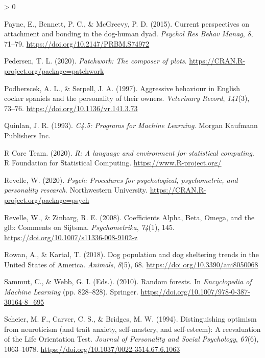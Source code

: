 \documentclass[
  english,
  ,pub,floatsintext]{apa6}
\newlength{\cslhangindent}
\newenvironment{CSLReferences}[2] %
 {%
  \setlength{\parindent}{0pt}
  \ifodd #1 \everypar{\setlength{\hangindent}{\cslhangindent}}\ignorespaces\fi
  \ifnum #2 > 0
  \setlength{\parskip}{#2\baselineskip}
  \fi
 }%
 {}
\begin{document}
\begin{CSLReferences}{1}{0}
\leavevmode\hypertarget{ref-Payne.etal.2015}{}%
Payne, E., Bennett, P. C., \& McGreevy, P. D. (2015). Current perspectives on attachment and bonding in the dog-human dyad. \emph{Psychol Res Behav Manag}, \emph{8}, 71--79. \url{https://doi.org/10.2147/PRBM.S74972}

\leavevmode\hypertarget{ref-R-patchwork}{}%
Pedersen, T. L. (2020). \emph{Patchwork: The composer of plots}. \url{https://CRAN.R-project.org/package=patchwork}

\leavevmode\hypertarget{ref-Podberscek.Serpell.1997}{}%
Podberscek, A. L., \& Serpell, J. A. (1997). Aggressive behaviour in {English} cocker spaniels and the personality of their owners. \emph{Veterinary Record}, \emph{141}(3), 73--76. \url{https://doi.org/10.1136/vr.141.3.73}

\leavevmode\hypertarget{ref-Quinlan.1993}{}%
Quinlan, J. R. (1993). \emph{C4.5: {Programs} for {Machine Learning}}. {Morgan Kaufmann Publishers Inc.}

\leavevmode\hypertarget{ref-R-base}{}%
R Core Team. (2020). \emph{R: A language and environment for statistical computing}. R Foundation for Statistical Computing. \url{https://www.R-project.org/}

\leavevmode\hypertarget{ref-R-psych}{}%
Revelle, W. (2020). \emph{Psych: Procedures for psychological, psychometric, and personality research}. Northwestern University. \url{https://CRAN.R-project.org/package=psych}

\leavevmode\hypertarget{ref-Revelle.Zinbarg.2008}{}%
Revelle, W., \& Zinbarg, R. E. (2008). Coefficients {Alpha}, {Beta}, {Omega}, and the glb: {Comments} on {Sijtsma}. \emph{Psychometrika}, \emph{74}(1), 145. \url{https://doi.org/10.1007/s11336-008-9102-z}

\leavevmode\hypertarget{ref-Rowan.Kartal.2018}{}%
Rowan, A., \& Kartal, T. (2018). Dog population and dog sheltering trends in the {United States} of {America}. \emph{Animals}, \emph{8}(5), 68. \url{https://doi.org/10.3390/ani8050068}

\leavevmode\hypertarget{ref-Sammut.Webb.2010}{}%
Sammut, C., \& Webb, G. I. (Eds.). (2010). Random forests. In \emph{Encyclopedia of {Machine Learning}} (pp. 828--828). {Springer}. \url{https://doi.org/10.1007/978-0-387-30164-8_695}

\leavevmode\hypertarget{ref-Scheier.etal.1994}{}%
Scheier, M. F., Carver, C. S., \& Bridges, M. W. (1994). Distinguishing optimism from neuroticism (and trait anxiety, self-mastery, and self-esteem): {A} reevaluation of the {Life Orientation Test}. \emph{Journal of Personality and Social Psychology}, \emph{67}(6), 1063--1078. \url{https://doi.org/10.1037/0022-3514.67.6.1063}


\end{CSLReferences}
\end{document}
